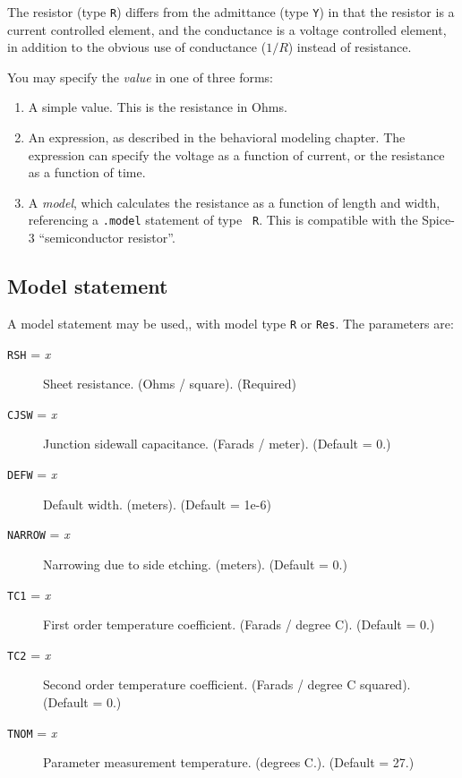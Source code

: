 The resistor (type {\tt R}) differs from the admittance (type {\tt Y}) in
that the resistor is a current controlled element, and the conductance is a
voltage controlled element, in addition to the obvious use of conductance
($1/R$) instead of resistance.

You may specify the {\it value} in one of three forms:

\begin{enumerate}
  
\item A simple value.  This is the resistance in Ohms.
  
\item An expression, as described in the behavioral modeling chapter.
  The expression can specify the voltage as a function of current, or
  the resistance as a function of time.
  
\item A {\it model}, which calculates the resistance as a function of
  length and width, referencing a {\tt .model} statement of type {\tt
    R}.  This is compatible with the Spice-3 ``semiconductor
  resistor''.

\end{enumerate}
\subsection{Model statement}

A model statement may be used,, with model type {\tt R} or {\tt Res}.
The parameters are:

\begin{description}
  
\item[{\tt RSH} = {\it x}] Sheet resistance. (Ohms / square). (Required)
  
\item[{\tt CJSW} = {\it x}] Junction sidewall capacitance. (Farads /
  meter).  (Default = 0.)
  
\item[{\tt DEFW} = {\it x}] Default width. (meters).  (Default = 1e-6)
  
\item[{\tt NARROW} = {\it x}] Narrowing due to side etching. (meters).
  (Default = 0.)
  
\item[{\tt TC1} = {\it x}] First order temperature coefficient.
  (Farads / degree C).  (Default = 0.)
  
\item[{\tt TC2} = {\it x}] Second order temperature coefficient.
  (Farads / degree C squared).  (Default = 0.)
  
\item[{\tt TNOM} = {\it x}] Parameter measurement temperature.
  (degrees C.).  (Default = 27.)

\end{description}

